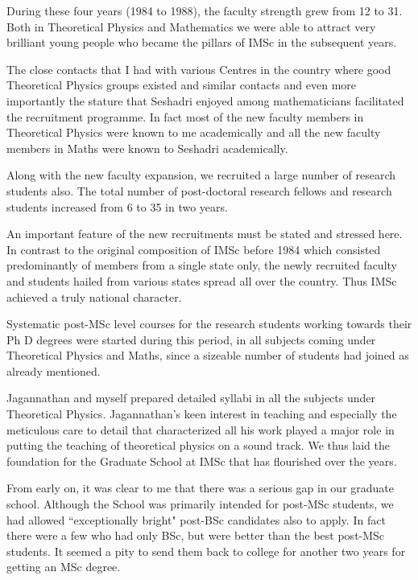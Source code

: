 During these four years (1984 to 1988), the faculty strength grew from 
12 to 31. Both in Theoretical Physics and Mathema\-tics we were able to 
attract very brilliant young people who became the pillars of IMSc in 
the subsequent years.


The close contacts that I had with various Centres in the country where 
good Theoretical Physics groups existed and simi\-lar contacts and even 
more importantly the stature that Seshadri enjoyed among mathematicians 
facilitated the recruitment programme. In fact most of the new faculty 
members in Theoretical Physics were known to me academically and all the 
new faculty members in Maths were known to Seshadri academically.


Along with the new faculty expansion, we recruited a large number of 
research students also. The total number of post-doctoral research 
fellows and research students increased from 6 to 35 in two years.


An important feature of the new recruitments must be stated and stressed 
here. In contrast to the original composition of IMSc before 1984 which 
consisted predominantly of members from a single state only, the newly 
recruited faculty and stude\-nts hailed from various states spread all 
over the country. Thus IMSc achieved a truly national character.


Systematic post-MSc level courses for the research students working 
towards their Ph D degrees were started during this period, in all 
subjects coming under Theoretical Physics and Maths, since a sizeable 
number of students had joined as already mentioned.


Jagannathan and myself prepared detailed syllabi in all the subjects 
under Theoretical Physics. Jagannathan's keen inte\-rest in teaching and 
especially the meticulous care to detail that characterized all his work 
played a major role in putting the teaching of theoretical physics on a 
sound track. We thus laid the foundation for the Graduate School at IMSc 
that has flouri\-shed over the years.


From early on, it was clear to me that there was a serious gap in our 
graduate school. Although the School was primarily intended for post-MSc 
students, we had allowed ``exceptionally bright" post-BSc candidates also 
to apply. In fact there were a few who had only BSc, but were better than 
the best post-MSc students. It seemed a pity to send them back to 
college for ano\-ther two years for getting an MSc degree.


